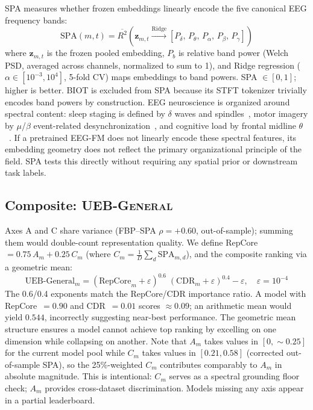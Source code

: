 \documentclass{article}
\newcommand{\uebgen}{\textsc{UEB-General}\xspace}
\begin{document}
SPA measures whether frozen embeddings linearly encode the five canonical EEG frequency bands:
\begin{equation}
\text{SPA}(m, t) = \overline{R^2}\!\left(\mathbf{z}_{m,t} \xrightarrow{\text{Ridge}} [P_\delta,\, P_\theta,\, P_\alpha,\, P_\beta,\, P_\gamma]\right)
\label{eq:spa}
\end{equation}
where $\mathbf{z}_{m,t}$ is the frozen pooled embedding, $P_b$ is relative band power (Welch PSD, averaged across channels, normalized to sum to 1), and Ridge regression ($\alpha \in [10^{-3}, 10^4]$, 5-fold CV) maps embeddings to band powers. SPA $\in [0,1]$; higher is better. BIOT is excluded from SPA because its STFT tokenizer trivially encodes band powers by construction. EEG neuroscience is organized around spectral content: sleep staging is defined by $\delta$ waves and spindles~\citep{berry2012aasm}, motor imagery by $\mu$/$\beta$ event-related desynchronization~\citep{pfurtscheller1999erd}, and cognitive load by frontal midline $\theta$~\citep{onton2005frontal}. If a pretrained EEG-FM does not linearly encode these spectral features, its embedding geometry does not reflect the primary organizational principle of the field. SPA tests this directly without requiring any spatial prior or downstream task labels.

\subsection{Composite: \uebgen}
\label{sec:composite}

Axes A and C share variance (FBP--SPA $\rho = +0.60$, out-of-sample); summing them would double-count representation quality. We define RepCore $= 0.75\, A_m + 0.25\, C_m$ (where $C_m = \frac{1}{D}\sum_d \text{SPA}_{m,d}$), and the composite ranking via a geometric mean:
\begin{equation}
\boxed{\text{UEB-General}_m = (\text{RepCore}_m + \varepsilon)^{0.6}\;(\text{CDR}_m + \varepsilon)^{0.4} - \varepsilon, \quad \varepsilon = 10^{-4}}
\label{eq:uebgeneral}
\end{equation}
The 0.6/0.4 exponents match the RepCore/CDR importance ratio. A model with RepCore~$= 0.90$ and CDR~$= 0.01$ scores $\approx 0.09$; an arithmetic mean would yield $0.544$, incorrectly suggesting near-best performance. The geometric mean structure ensures a model cannot achieve top ranking by excelling on one dimension while collapsing on another. Note that $A_m$ takes values in $[0, {\sim}0.25]$ for the current model pool while $C_m$ takes values in $[0.21, 0.58]$ (corrected out-of-sample SPA), so the 25\%-weighted $C_m$ contributes comparably to $A_m$ in absolute magnitude. This is intentional: $C_m$ serves as a spectral grounding floor check; $A_m$ provides cross-dataset discrimination. Models missing any axis appear in a partial leaderboard.
\end{document}
